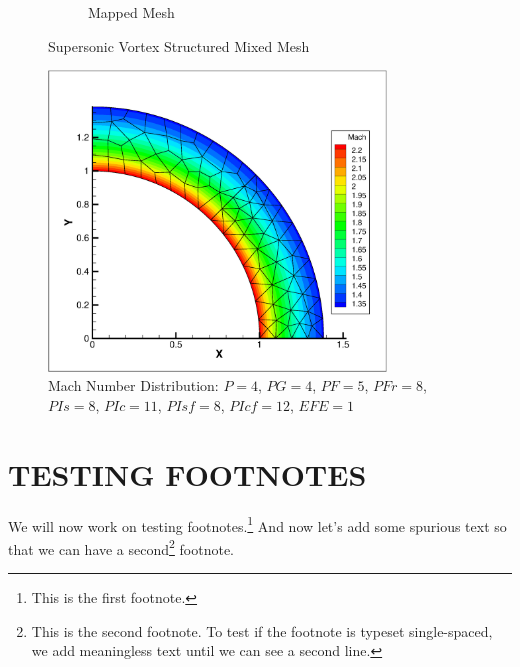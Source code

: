 \documentclass[12pt,Bold,letterpaper,TexShade]{mcgilletdclass}
\numberwithin{equation}{section}
\begin{document}
\begin{figure}
\begin{subfigure}[b]{0.45\textwidth}
        \caption{Mapped Mesh}
    \end{subfigure}
    \caption{Supersonic Vortex Structured Mixed Mesh}
    \label{fig:SupersonicVortexStructuredML1P4}
\end{figure}


\begin{figure}[ht!] 
\centering
\includegraphics[width=0.8\textwidth]{./figures/SupersonicVortexMachDist_ML1P4.eps}
\caption{Mach Number Distribution: $P=4$, $PG=4$, $PF=5$, $PFr=8$, $PIs =8$, $PIc =11$, $PIsf =8$, $PIcf =12$, $EFE = 1$}
\label{fig:MachDistP4PG4PF5PFr8PIs8PIc11PIsf8PIcf12EFE1}
\end{figure}







\chapter{TESTING FOOTNOTES}
We will now work on testing footnotes.\footnote{This is the first footnote.}
And now let's add some spurious text so that we can have a second\footnote{This
is the second footnote. To test if the footnote is typeset single-spaced, 
we add meaningless text until we can see a second line.} footnote.



	




%
%
%
%



%
\end{document}

